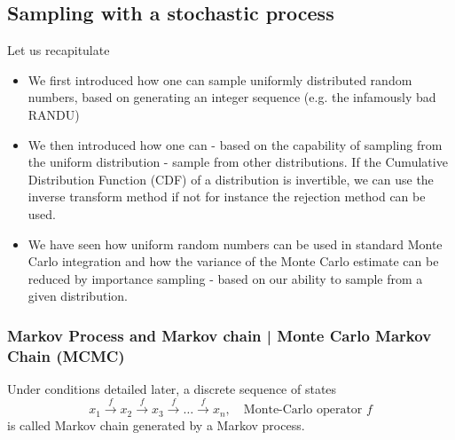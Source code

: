 \subsection{Sampling with a stochastic process}
Let us recapitulate
\begin{itemize}
    \item We first introduced how one can sample uniformly distributed random numbers, based on generating
    an integer sequence (e.g. the infamously bad RANDU)
    \item We then introduced how one can - based on the capability of sampling from the uniform distribution - sample from
    other distributions. If the Cumulative Distribution Function (CDF) of a distribution is invertible, we can use the inverse transform method
    if not for instance the rejection method can be used.
    \item We have seen how uniform random numbers can be used in standard Monte Carlo integration and how the variance of the
    Monte Carlo estimate can be reduced by importance sampling - based on our ability to sample from a given distribution.
\end{itemize}

\subsubsection{Markov Process and Markov chain | Monte Carlo Markov Chain (MCMC)}
Under conditions detailed later, a discrete sequence of states
\begin{equation}
    x_1 \stackrel{f}{\rightarrow} x_2 \stackrel{f}{\rightarrow} x_3 \xrightarrow{f} \ldots \stackrel{f}{\rightarrow} x_n, \quad \text{Monte-Carlo operator } f
\end{equation}
is called \textcolor{blue1}{Markov chain generated by a Markov process}.

